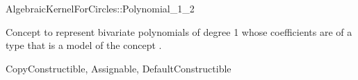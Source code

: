 \begin{ccRefConcept}{AlgebraicKernelForCircles::Polynomial_1_2}

\ccDefinition

Concept to represent bivariate polynomials of degree 1 whose
coefficients are of a type that is a model of the concept
.

\ccRefines
CopyConstructible, Assignable, DefaultConstructible






\ccHasModels


\ccSeeAlso


\end{ccRefConcept}
